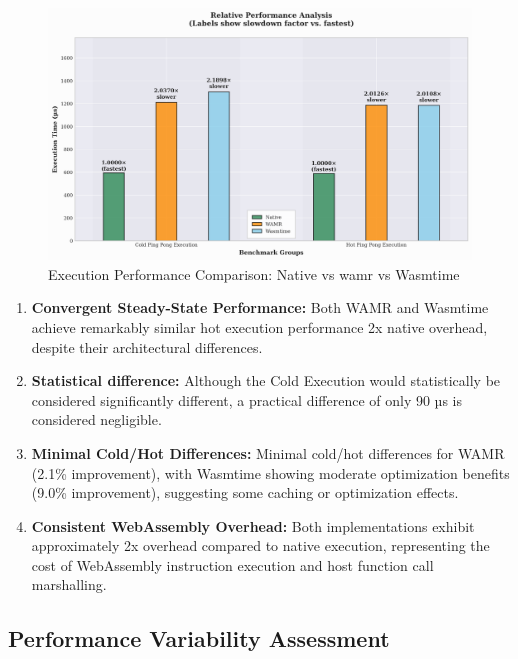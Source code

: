 \begin{figure}[htbp]
    \centering
    \includegraphics[width=1.0\textwidth]{images/wasm-execution-relative}
    \caption{Execution Performance Comparison: Native vs \acrshort{wamr} vs Wasmtime}
    \label{fig:wasm-execution-relative}
\end{figure}

\begin{enumerate}
    \item \textbf{Convergent Steady-State Performance:} Both WAMR and Wasmtime achieve remarkably similar hot execution performance 2x native overhead, despite their architectural differences.

    \item \textbf{Statistical difference:} Although the Cold Execution would statistically be considered significantly different, a practical difference of only 90 µs is considered negligible.
    
    \item \textbf{Minimal Cold/Hot Differences:} Minimal cold/hot differences for WAMR (2.1\% improvement), with Wasmtime showing moderate optimization benefits (9.0\% improvement), suggesting some caching or optimization effects.
    
    \item \textbf{Consistent WebAssembly Overhead:} Both implementations exhibit approximately 2x overhead compared to native execution, representing the cost of WebAssembly instruction execution and host function call marshalling.
\end{enumerate}

\subsection{Performance Variability Assessment}
\label{subsec:eval-execution-variability}

